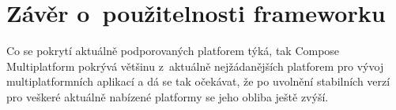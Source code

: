 






\section{Závěr o~použitelnosti frameworku}


Co se pokrytí aktuálně podporovaných platforem týká, tak Compose Multiplatform pokrývá většinu z~aktuálně nejžádanějších platforem pro 
vývoj multiplatformních aplikací a dá se tak očekávat, že po uvolnění stabilních verzí pro veškeré aktuálně nabízené platformy se 
jeho obliba ještě zvýší. 



